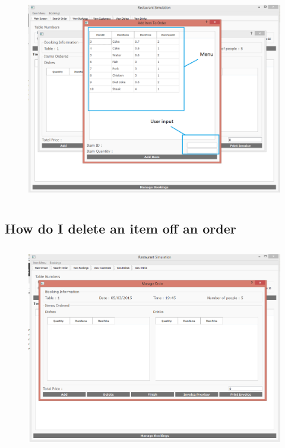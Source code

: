 \begin{figure}[H]
    \includegraphics[height = 9cm]{./Manual/images/AddItemOrder2} 
    \caption{} \label{fig:additemorder3}
\end{figure}

\newpage
\subsection{How do I delete an item off an order}

\begin{figure}[H]
    \includegraphics[height = 9cm]{./Manual/images/base/ManageOrder} 
    \caption{} \label{fig:additemorder1}
\end{figure}

